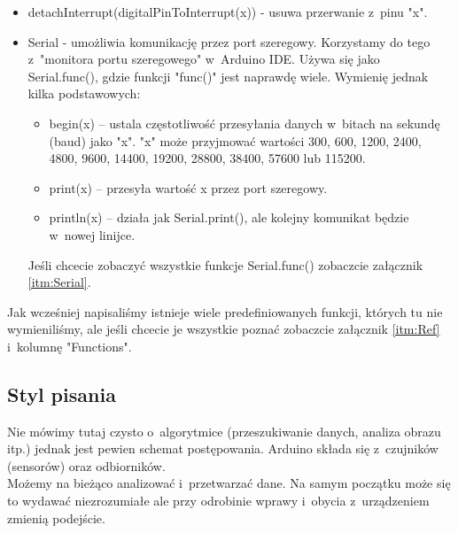 \documentclass[a4paper,12pt, twoside]{article}
\begin{document}
\begin{itemize}
		\item detachInterrupt(digitalPinToInterrupt(x)) - usuwa przerwanie z~pinu "x".
		\item Serial - umożliwia komunikację przez port szeregowy. Korzystamy do tego z~"monitora portu szeregowego" w~Arduino IDE. Używa się jako Serial.func(), gdzie funkcji "func()" jest naprawdę wiele. Wymienię jednak kilka podstawowych:
			\begin{itemize}
				\item begin(x) -- ustala częstotliwość przesyłania danych w~bitach na sekundę (baud) jako "x". "x" może przyjmować wartości 300, 600, 1200, 2400, 4800, 9600, 14400, 19200, 28800, 38400, 57600 lub 115200.
				\item print(x) -- przesyła wartość x przez port szeregowy.
				\item println(x) -- działa jak Serial.print(), ale kolejny komunikat będzie w~nowej linijce.
			\end{itemize}
			Jeśli chcecie zobaczyć wszystkie funkcje Serial.func() zobaczcie załącznik \ref{itm:Serial}.
	\end{itemize}
	Jak wcześniej napisaliśmy istnieje wiele predefiniowanych funkcji, których tu nie wymieniliśmy, ale jeśli chcecie je wszystkie poznać zobaczcie załącznik \ref{itm:Ref} i~kolumnę "Functions".


	\subsection {Styl pisania}
	Nie mówimy tutaj czysto o~algorytmice (przeszukiwanie danych, analiza obrazu itp.) jednak jest pewien schemat postępowania. Arduino składa się z~czujników (sensorów) oraz odbiorników. %
	\\
	Możemy  na bieżąco analizować i~przetwarzać dane. Na samym początku może się to wydawać niezrozumiałe ale przy odrobinie wprawy i~obycia z~urządzeniem zmienią podejście.
		
\end{document}
